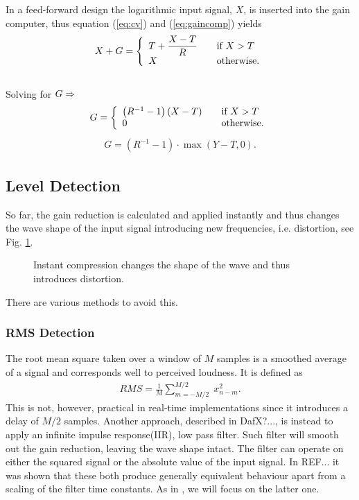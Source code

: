 In a feed-forward design the logarithmic input signal, $X$,  is inserted into the gain computer, thus equation (\ref{eq:cv}) and (\ref{eq:gaincomp}) yields
\begin{equation}
X+G = \left\{ 
  \begin{array}{l l}
    T+ \dfrac{X-T}{R} & \quad \text{if $X > T$}\\
    X & \quad \text{otherwise.}
  \end{array} \right.
\end{equation}
\\Solving for $G \rm \Rightarrow$
\begin{equation} \label{eq:c}
G = \left\{ 
  \begin{array}{l l}
    \left(R^{-1}-1\right)(X-T)& \quad \text{if $X > T$}\\
    0 & \quad \text{otherwise.}
  \end{array} \right.
\end{equation}
\begin{align}
G = (R^{-1}-1)\cdot \max\left(Y-T,0\right).
\end{align}

\subsection{Level Detection}
So far, the gain reduction is calculated and applied instantly and thus changes the wave shape of the input signal introducing new frequencies, i.e. distortion, see Fig. \ref{fig:instant_comp}. 
\begin{figure}[ht]
\centering

\caption{Instant compression changes the shape of the wave and thus introduces distortion.} 
\label{fig:instant_comp}
\end{figure}
There are various methods to avoid this.
\subsubsection{RMS Detection}
The root mean square taken over a window of $M$ samples is a smoothed average of a signal and corresponds well to perceived loudness\cite{giannoullis}. It is defined as 
\begin{align}
RMS = \frac{1}{M}\sum_{m=-M/2}^{M/2}\;x_{n-m}^2.
\end{align}
This is not, however, practical in real-time implementations since it introduces a delay of $M/2$ samples. Another approach, described in DafX?...,  is instead to apply an infinite impulse response(IIR), low pass filter. Such filter will smooth out the gain reduction, leaving the wave shape intact. The filter can operate on either the squared signal or the absolute value of the input signal.  In REF... it was shown that these both produce generally equivalent behaviour apart from a scaling of the filter time constants. As in \cite{gianoullis}, we will focus on the latter one.  

